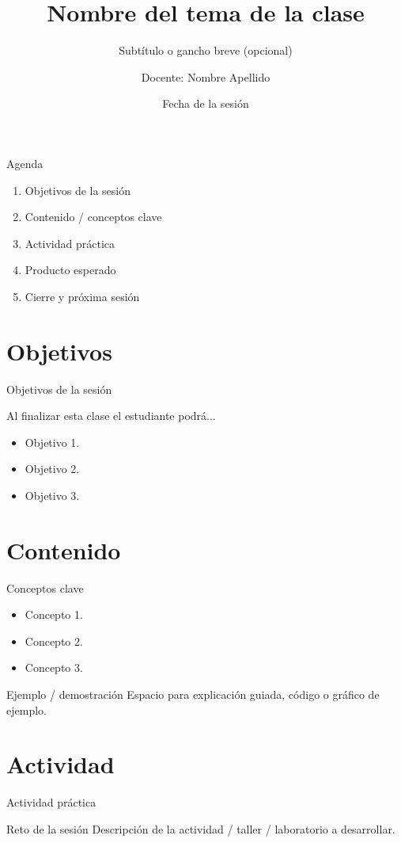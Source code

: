 \documentclass[aspectratio=169,11pt]{beamer}
\title{Nombre del tema de la clase}
\subtitle{Subtítulo o gancho breve (opcional)}
\author{Docente: Nombre Apellido}
\date{Fecha de la sesión}
\begin{document}
{
\begin{frame}[plain]
  \titlepage
\end{frame}
}

\begin{frame}{Agenda}
  \begin{enumerate}
    \item Objetivos de la sesión
    \item Contenido / conceptos clave
    \item Actividad práctica
    \item Producto esperado
    \item Cierre y próxima sesión
  \end{enumerate}
\end{frame}

\section{Objetivos}
\begin{frame}{Objetivos de la sesión}
  \begin{block}{Al finalizar esta clase el estudiante podrá...}
    \begin{itemize}
      \item Objetivo 1.
      \item Objetivo 2.
      \item Objetivo 3.
    \end{itemize}
  \end{block}
\end{frame}

\section{Contenido}
\begin{frame}{Conceptos clave}
  \begin{itemize}
    \item Concepto 1.
    \item Concepto 2.
    \item Concepto 3.
  \end{itemize}
\end{frame}

\begin{frame}{Ejemplo / demostración}
  Espacio para explicación guiada, código o gráfico de ejemplo.
\end{frame}

\section{Actividad}
\begin{frame}{Actividad práctica}
  \begin{alertblock}{Reto de la sesión}
    Descripción de la actividad / taller / laboratorio a desarrollar.
  \end{alertblock}
\end{frame}
\end{document}
